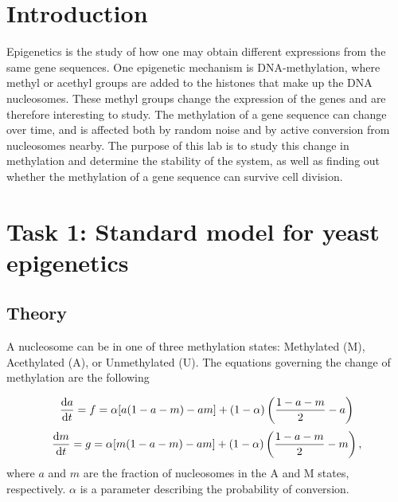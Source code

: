 \documentclass[fleqn,10pt]{SelfArx} %
\begin{document}





\section{Introduction}
Epigenetics is the study of how one may obtain different expressions from the same gene sequences. One epigenetic mechanism is DNA-methylation, where methyl or acethyl groups are added to the histones that make up the DNA nucleosomes. These methyl groups change the expression of the genes and are therefore interesting to study.
The methylation of a gene sequence can change over time, and is affected both by random noise and by active conversion from nucleosomes nearby. The purpose of this lab is to study this change in methylation and determine the stability of the system, as well as finding out whether the methylation of a gene sequence can survive cell division. 

\section{Task 1: Standard model for yeast epigenetics}
\subsection{Theory}

A nucleosome can be in one of three methylation states: Methylated (M), Acethylated (A), or Unmethylated (U). 
The equations governing the change of methylation are the following

\begin{equation}
	\dv {a}{t} = f = \alpha[a(1-a-m) - am] + (1-\alpha )\left(\frac{1-a-m}{2}  - a\right)
	\label{eq:dadt}
\end{equation}
\begin{equation}
	\dv {m}{t} = g = \alpha[m(1-a-m) - am] + (1-\alpha )\left(\frac{1-a-m}{2}  - m\right),
	\label{eq:dmdt}
\end{equation}
where $a$ and $m$ are the fraction of nucleosomes in the A and M states, respectively. $\alpha$ is a parameter describing the probability of conversion.
\end{document}
